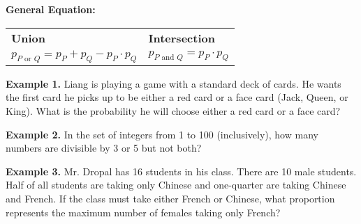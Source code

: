 \bigskip
\textbf{General Equation:}

\begin{tabularx}{\textwidth}{*2{@{}>{\centering\arraybackslash}X}}
\textbf{\large Union} & \textbf{\large Intersection}\\
$p_{P\mbox{ or }Q} = p_P+p_Q-p_P\cdot p_Q$ & $p_{P\mbox{ and }Q} = p_P\cdot p_Q$
\end{tabularx}

\vfill
\textbf{Example 1.} Liang is playing a game with a standard deck of cards. He wants the first card he picks up to be either a red card or a face card (Jack, Queen, or King). What is the probability he will choose either a red card or a face card?

\vfill
\textbf{Example 2.} In the set of integers from 1 to 100 (inclusively), how many numbers are divisible by 3 or 5 but not both?

\vfill
\textbf{Example 3.} Mr. Dropal has 16 students in his class. There are 10 male students. Half of all students are taking only Chinese and one-quarter are taking Chinese and French. If the class must take either French or Chinese, what proportion represents the maximum number of females taking only French?


